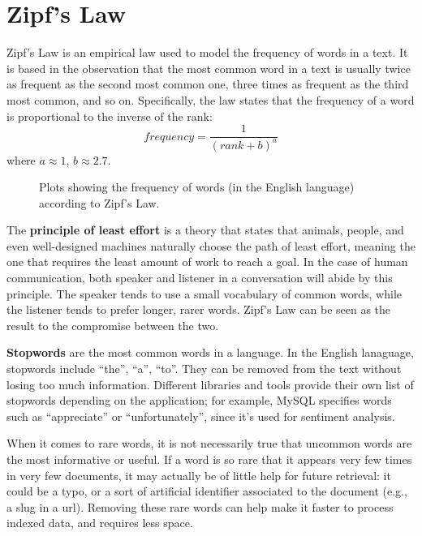 \section{Zipf's Law}

Zipf's Law is an empirical law used to model the frequency of words in a text. It is based in the observation that the most common word in a text is usually twice as frequent as the second most common one, three times as frequent as the third most common, and so on. Specifically, the law states that the frequency of a word is proportional to the inverse of the rank:
\begin{equation*}
    \textit{frequency} = \frac{1}{(\textit{rank} + b)^a}
\end{equation*}
where $a \approx 1$, $b \approx 2.7$.

\begin{figure}[ht]
    \centering
    
    \caption{Plots showing the frequency of words (in the English language) according to Zipf's Law.}
    \label{fig:zipf}
\end{figure}

The \textbf{principle of least effort} is a theory that states that animals, people, and even well-designed machines naturally choose the path of least effort, meaning the one that requires the least amount of work to reach a goal. In the case of human communication, both speaker and listener in a conversation will abide by this principle. The speaker tends to use a small vocabulary of common words, while the listener tends to prefer longer, rarer words. Zipf's Law can be seen as the result to the compromise between the two.

\textbf{Stopwords} are the most common words in a language. In the English lanaguage, stopwords include ``the'', ``a'', ``to''. They can be removed from the text without losing too much information. Different libraries and tools provide their own list of stopwords depending on the application; for example, MySQL specifies words such as ``appreciate'' or ``unfortunately'', since it's used for sentiment analysis.

When it comes to rare words, it is not necessarily true that uncommon words are the most informative or useful. If a word is so rare that it appears very few times in very few documents, it may actually be of little help for future retrieval: it could be a typo, or a sort of artificial identifier associated to the document (e.g., a slug in a url). Removing these rare words can help make it faster to process indexed data, and requires less space.

